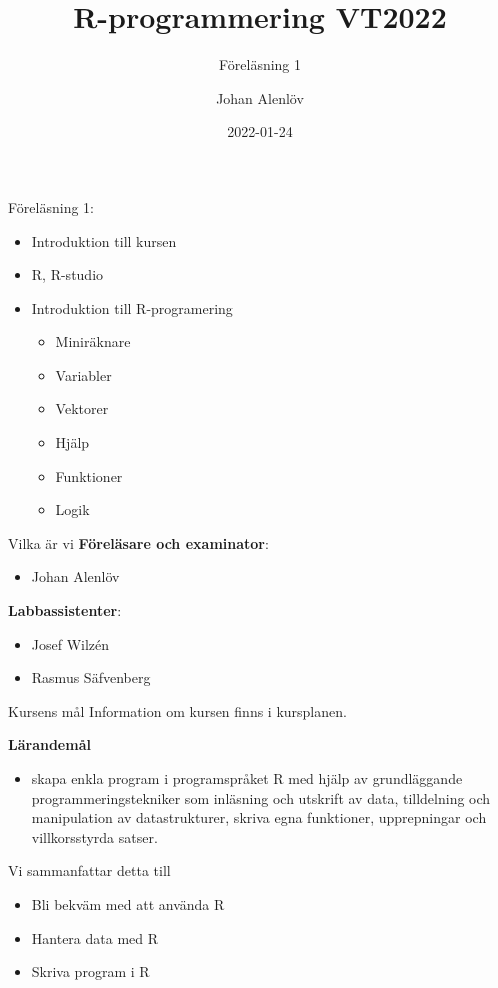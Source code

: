 \documentclass[
  10pt,
  ignorenonframetext,
]{beamer}
\title{R-programmering VT2022}
\subtitle{Föreläsning 1}
\author{Johan Alenlöv}
\date{2022-01-24}
\institute{Linköpings Universitet}
\providecommand{\tightlist}{%
  \setlength{\itemsep}{0pt}\setlength{\parskip}{0pt}}
\begin{document}
\frame{\titlepage}

\begin{frame}{Föreläsning 1:}
\protect\hypertarget{fuxf6reluxe4sning-1}{}
\begin{itemize}
\tightlist
\item
  Introduktion till kursen
\item
  R, R-studio
\item
  Introduktion till R-programering

  \begin{itemize}
  \tightlist
  \item
    Miniräknare
  \item
    Variabler
  \item
    Vektorer
  \item
    Hjälp
  \item
    Funktioner
  \item
    Logik
  \end{itemize}
\end{itemize}
\end{frame}

\begin{frame}{Vilka är vi}
\protect\hypertarget{vilka-uxe4r-vi}{}
\textbf{Föreläsare och examinator}:

\begin{itemize}
\tightlist
\item
  Johan Alenlöv
\end{itemize}

\textbf{Labbassistenter}:

\begin{itemize}
\tightlist
\item
  Josef Wilzén
\item
  Rasmus Säfvenberg
\end{itemize}
\end{frame}

\begin{frame}{Kursens mål}
\protect\hypertarget{kursens-muxe5l}{}
Information om kursen finns i kursplanen.

\textbf{Lärandemål}

\begin{itemize}
\tightlist
\item
  skapa enkla program i programspråket R med hjälp av grundläggande
  programmeringstekniker som inläsning och utskrift av data, tilldelning
  och manipulation av datastrukturer, skriva egna funktioner,
  upprepningar och villkorsstyrda satser.
\end{itemize}

\pause Vi sammanfattar detta till

\begin{itemize}
\tightlist
\item
  Bli bekväm med att använda R
\item
  Hantera data med R
\item
  Skriva program i R
\end{itemize}
\end{frame}
\end{document}
